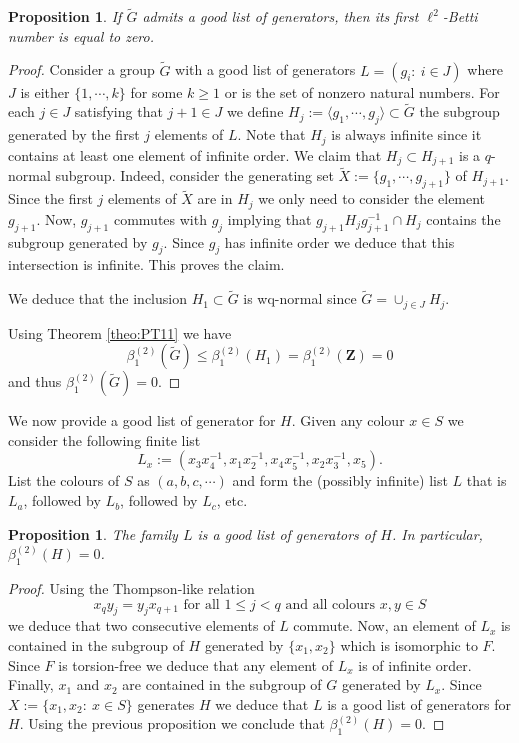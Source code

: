 \documentclass[a4paper, 12pt]{amsart}
\numberwithin{equation}{section}
\newtheorem{proposition}[theorem]{Proposition}
\theoremstyle{definition}
\newcommand{\betti}{\beta^{(2)}_1}
\newcommand{\la}{\langle}
\newcommand{\ra}{\rangle}
\newcommand{\ti}{\tilde}
\newcommand{\Z}{\mathbf{Z}}
\begin{document}
\begin{proposition}
If $\ti G$ admits a good list of generators, then its first $\ell^2$-Betti number is equal to zero.
\end{proposition}

\begin{proof}
Consider a group $\ti G$ with a good list of generators $L=(g_i:\ i\in J)$ where $J$ is either $\{1,\cdots,k\}$ for some $k\geq 1$ or is the set of nonzero natural numbers.
For each $j\in J$ satisfying that $j+1\in J$ we define $H_j:=\la g_1,\cdots,g_j\ra \subset \ti G$ the subgroup generated by the first $j$ elements of $L$.
Note that $H_j$ is always infinite since it contains at least one element of infinite order. 
We claim that $H_j\subset H_{j+1}$ is a $q$-normal subgroup.
Indeed, consider the generating set $\ti X:=\{g_1,\cdots,g_{j+1}\}$ of $H_{j+1}$.
Since the first $j$ elements of $\ti X$ are in $H_j$ we only need to consider the element $g_{j+1}$. 
Now, $g_{j+1}$ commutes with $g_j$ implying that $g_{j+1} H_j g_{j+1}^{-1}\cap H_j$ contains the subgroup generated by $g_j$.
Since $g_j$ has infinite order we deduce that this intersection is infinite.
This proves the claim.

We deduce that the inclusion $H_1\subset \ti G$ is wq-normal since $\ti G=\cup_{j\in J} H_j$.

Using Theorem \ref{theo:PT11} we have 
$$\betti(\ti G) \leq \betti(H_1) =\betti(\Z)=0$$
and thus $\betti(\ti G)=0.$
\end{proof}

We now provide a good list of generator for $H$.
Given any colour $x\in S$ we consider the following finite list 
$$L_x:=(x_3x_4^{-1}, x_1x_2^{-1}, x_4x_5^{-1}, x_2x_3^{-1}, x_5).$$
List the colours of $S$ as $(a,b,c,\cdots)$ and form the (possibly infinite) list $L$ that is $L_a$, followed by $L_b$, followed by $L_c$, etc.

\begin{proposition}
The family $L$ is a good list of generators of $H$. In particular, $\betti(H)=0$.
\end{proposition}

\begin{proof}
Using the Thompson-like relation 
$$x_q y_j= y_j x_{q+1} \text{ for all } 1\leq j<q \text{ and all colours } x,y \in S$$
we deduce that two consecutive elements of $L$ commute.
Now, an element of $L_x$ is contained in the subgroup of $H$ generated by $\{x_1,x_2\}$ which is isomorphic to $F$. Since $F$ is torsion-free we deduce that any element of $L_x$ is of infinite order.
Finally, $x_1$ and $x_2$ are contained in the subgroup of $G$ generated by $L_x$.
Since $X:=\{x_1,x_2:\ x\in S\}$ generates $H$ we deduce that $L$ is a good list of generators for $H$.
Using the previous proposition we conclude that $\betti(H)=0$.
\end{proof}
\end{document}

